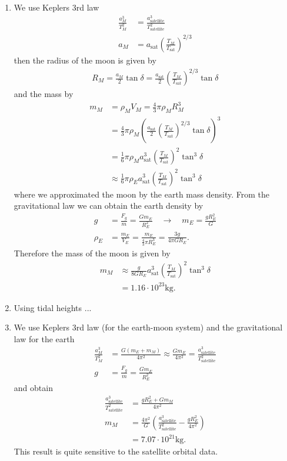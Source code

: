 \documentclass[10pt,a4paper]{article}
\theoremstyle{definition}
\begin{document}
\begin{enumerate}
\item We use Keplers 3rd law
\begin{align}
    \frac{a_M^3}{T_M^2}&=\frac{a_\text{satellite}^3}{T_\text{satellite}^2}\\
    a_M&=a_\text{sat}\left(\frac{T_M}{T_\text{sat}}\right)^{2/3}
\end{align}
then the radius of the moon is given by
\begin{align}
R_M=\frac{a_M}{2}\tan\delta=\frac{a_\text{sat}}{2}\left(\frac{T_M}{T_\text{sat}}\right)^{2/3}\tan\delta
\end{align}
and the mass by
\begin{align}
    m_M&=\rho_M V_M=\frac{4}{3}\pi\rho_M R_M^3\\
    &=\frac{4}{3}\pi\rho_M \left(\frac{a_\text{sat}}{2}\left(\frac{T_M}{T_\text{sat}}\right)^{2/3}\tan\delta \right)^3\\
    &=\frac{1}{6}\pi\rho_M a_\text{sat}^3\left(\frac{T_M}{T_\text{sat}}\right)^2\tan^3\delta \\
    &\approx\frac{1}{6}\pi\rho_E a_\text{sat}^3\left(\frac{T_M}{T_\text{sat}}\right)^2\tan^3\delta 
\end{align}
where we approximated the moon by the earth mass density. From the gravitational law we can obtain the earth density by
\begin{align}
    g&=\frac{F_g}{m}=\frac{Gm_E}{R_E^2}\quad\rightarrow\quad m_E=\frac{gR_E^2}{G}\\
    \rho_E&=\frac{m_E}{V_E}=\frac{m_E}{\frac{4}{3}\pi R_E^3}=\frac{3g}{4\pi G R_E}.
\end{align}
Therefore the mass of the moon is given by
\begin{align}
    m_M&\approx\frac{g}{ 8G R_E} a_\text{sat}^3\left(\frac{T_M}{T_\text{sat}}\right)^2\tan^3\delta \\
    &=1.16\cdot10^{23}\text{kg}.
\end{align}

\item Using tidal heights ...

\item  We use Keplers 3rd law (for the earth-moon system) and the gravitational law for the earth 
\begin{align}
    \frac{a_M^3}{T_M^2}&=\frac{G(m_E+m_M)}{4\pi^2}\approx\frac{Gm_E}{4\pi^2}=\frac{a_\text{satellite}^3}{T_\text{satellite}^2}\\
    g&=\frac{F_g}{m}=\frac{Gm_E}{R_E^2}
\end{align}
and obtain
\begin{align}
    \frac{a_\text{satellite}^3}{T_\text{satellite}^2}&=\frac{gR_E^2+Gm_M}{4\pi^2}\\
    m_M&=\frac{4\pi^2}{G}\left(\frac{a_\text{satellite}^3}{T_\text{satellite}^2}-\frac{gR_E^2}{4\pi^2}\right)\\
    &=7.07\cdot10^{21}\text{kg}.
\end{align}
This result is quite sensitive to the satellite orbital data.
\end{enumerate}
\end{document}
